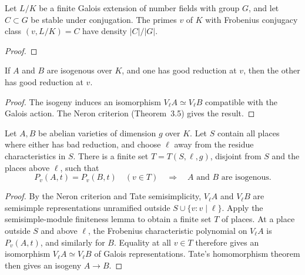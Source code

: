 \begin{theorem}
\label{thm:milne-chebotarev-detection}

Let $L/K$ be a finite Galois extension of number fields with group $G$, and let
$C\subset G$ be stable under conjugation.  The primes $v$ of $K$ with
Frobenius conjugacy class $(v,L/K)=C$ have density $|C|/|G|$.
\end{theorem}

\begin{proof}
\notready

\end{proof}


\begin{corollary}
\label{cor:milne-isogeny-good-reduction}

If $A$ and $B$ are isogenous over $K$, and one has good reduction at $v$, then
the other has good reduction at $v$.
\end{corollary}

\begin{proof}

The isogeny induces an isomorphism $V_\ell A\simeq V_\ell B$ compatible with
the Galois action.  The Neron criterion (Theorem~3.5) gives the result.

\end{proof}


\begin{theorem}
\label{thm:milne-finite-isogeny-possibilities}

Let $A,B$ be abelian varieties of dimension $g$ over $K$.  Let $S$ contain all
places where either has bad reduction, and choose $\ell$ away from the residue
characteristics in $S$.  There is a finite set
$T=T(S,\ell,g)$, disjoint from $S$ and the places above $\ell$, such that
\[
 P_v(A,t)=P_v(B,t)\quad(v\in T)\quad\Longrightarrow\quad A\text{ and }B
\text{ are isogenous}.
\]
\end{theorem}

\begin{proof}

By the Neron criterion and Tate semisimplicity, $V_\ell A$ and $V_\ell B$ are
semisimple representations unramified outside $S\cup\{v:v\mid\ell\}$.  Apply
the semisimple-module finiteness lemma to obtain a finite set $T$ of places.
At a place outside $S$ and above $\ell$, the Frobenius characteristic
polynomial on $V_\ell A$ is $P_v(A,t)$, and similarly for $B$.  Equality at
all $v\in T$ therefore gives an isomorphism
$V_\ell A\simeq V_\ell B$ of Galois representations.  Tate's homomorphism
theorem then gives an isogeny $A\to B$.

\end{proof}


